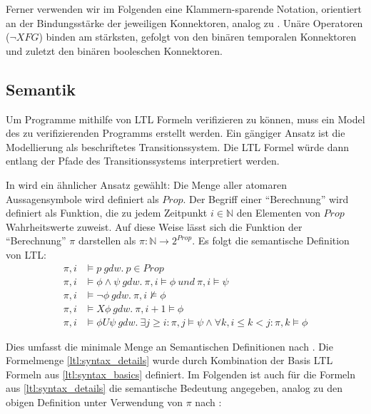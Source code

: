 Ferner verwenden wir im Folgenden eine Klammern-sparende Notation, orientiert an der Bindungsstärke der jeweiligen Konnektoren, analog zu \cite{huth+04}. Unäre Operatoren ($\lnot X F G$) binden am stärksten, gefolgt von den binären temporalen Konnektoren und zuletzt den binären booleschen Konnektoren.


\subsection{Semantik}

Um Programme mithilfe von LTL Formeln verifizieren zu können, muss ein Model des zu verifizierenden Programms erstellt werden. Ein gängiger Ansatz ist die Modellierung als beschriftetes Transitionssystem\cite{huth+04}. Die LTL Formel würde dann entlang der Pfade des Transitionssystems interpretiert werden. 

In \cite{vardi+96} wird ein ähnlicher Ansatz gewählt: Die Menge aller atomaren Aussagensymbole wird definiert als $Prop$. Der Begriff einer "`Berechnung"' wird definiert als Funktion, die zu jedem Zeitpunkt $i \in \mathbb{N}$ den Elementen von $Prop$ Wahrheitswerte zuweist. Auf diese Weise lässt sich die Funktion der "`Berechnung"' $\pi$ darstellen als $\pi : \mathbb{N} \rightarrow 2^{Prop}$. Es folgt die semantische Definition von LTL: 
\begin{equation*}
\begin{split}
    \pi, i &\models p\ gdw.\ p \in Prop\\
    \pi, i &\models \phi \land \psi\ gdw.\ \pi, i \models \phi\ und\ \pi, i \models \psi\\
    \pi, i &\models \lnot\phi\ gdw.\ \pi, i \not\models \phi\\
    \pi, i &\models X\phi\ gdw.\ \pi, i+1 \models \phi\\
    \pi, i &\models \phi U\psi\ gdw.\ \exists j \geq i: \pi, j \models \psi \land \forall k, i\leq k<j: \pi, k \models \phi
\end{split}
\end{equation*}

Dies umfasst die minimale Menge an Semantischen Definitionen nach \cite{vardi+96}. Die Formelmenge \ref{ltl:syntax_details} wurde durch Kombination der Basis LTL Formeln aus \ref{ltl:syntax_basics} definiert. Im Folgenden ist auch für die Formeln aus \ref{ltl:syntax_details} die semantische Bedeutung angegeben, analog zu den obigen Definition unter Verwendung von $\pi$ nach \cite{vardi+96}:

